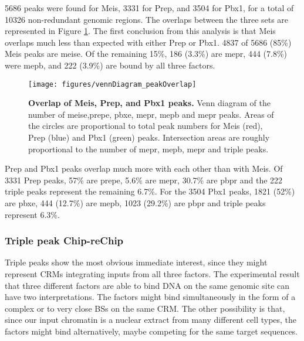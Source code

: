 5686 peaks were found for Meis, 3331 for Prep, and 3504 for Pbx1, for a total of 10326 non-redundant genomic regions. The overlaps between the three sets are represented in Figure \ref{fig:peakOverlap}. The first conclusion from this analysis is that Meis overlaps much less than expected with either Prep or Pbx1. 4837 of 5686 (85\%) Meis peaks are \ac{meise}. Of the remaining 15\%, 186 (3.3\%) are \ac{mepr}, 444 (7.8\%) were \ac{mepb}, and 222 (3.9\%) are bound by all three factors. 

\begin{figure}[]
  \centering
  \texttt{[image: figures/vennDiagram\_peakOverlap]}
  \caption[Overlap of Meis, Prep, and Pbx1 peaks]{\textbf{Overlap of Meis, Prep, and Pbx1 peaks.} Venn diagram of the number of \ac{meise},\ac{prepe}, \ac{pbxe}, \ac{mepr}, \ac{mepb} and \ac{mepr} peaks. Areas of the circles are proportional to total peak numbers for Meis (red), Prep (blue) and Pbx1 (green) peaks. Intersection areas are roughly proportional to the number of \ac{mepr}, \ac{mepb}, \ac{mepr} and triple peaks.}
  \label{fig:peakOverlap}
\end{figure}

Prep and Pbx1 peaks overlap much more with each other than with Meis. Of 3331 Prep peaks, 57\% are \ac{prepe},  5.6\% are \ac{mepr}, 30.7\% are \ac{pbpr} and the 222 triple peaks represent the remaining 6.7\%. For the 3504 Pbx1 peaks, 1821 (52\%) are \ac{pbxe}, 444 (12.7\%) are \ac{mepb}, 1023 (29.2\%) are \ac{pbpr} and triple peaks represent 6.3\%. 


\subsubsection{Triple peak Chip-reChip}

Triple peaks show the most obvious immediate interest, since they might represent \acp{CRM} integrating inputs from all three factors. The experimental result that three different factors are able to bind DNA on the same genomic site can have two interpretations. The factors might bind simultaneously in the form of a complex or to very close \acp{BS} on the same \ac{CRM}. The other possibility is that, since our input chromatin is a nuclear extract from many different cell types, the factors might bind alternatively, maybe competing for the same target sequences.

